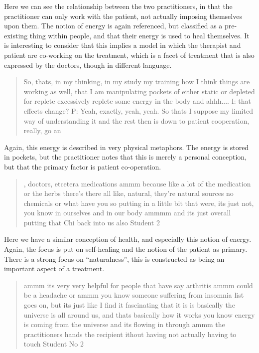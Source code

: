 Here we can see the relationship between the two practitioners, in that the practitioner can only work with the patient, not actually imposing themselves upon them. The notion of energy is again referenced, but classified as a pre-existing thing within people, and that their energy is used to heal themselves. It is interesting to consider that this implies a model in which the therapist and patient are co-working on the treatment, which is a facet of treatment that is also expressed by the doctors, though in different language. 

\begin{quotation}
  So, thats, in my thinking, in my study my training how I think things are working as well, that I am manipulating pockets of either static or depleted for replete excessively replete some energy in the body and ahhh....
I: that effects change?
P: Yeah, exactly, yeah, yeah. So thats I suppose my limited way of understanding it and the rest then is down to patient cooperation, really, go an

\end{quotation}

Again, this energy is described in very physical metaphors. The energy is stored in pockets, but the practitioner notes that this is merely a personal conception, but that the primary factor is patient co-operation. 



  
\begin{quotation}
  , doctors, etcetera medications ammm because like a lot of the medication or the herbs there's there all like, natural, they're natural sources no chemicals or what have you so putting in a little bit that were, its just not, you know in ourselves and in our body ammmm and its just overall putting that Chi back into us also
Student 2
\end{quotation}

Here we have a similar conception of health, and especially this notion  of energy. Again, the focus is put on self-healing and the notion of the patient as primary. There is a strong focus on ``naturalness'', this is constructed as being an important aspect of a treatment. 

\begin{quotation}
  ammm its very very helpful for people that have say arthritis ammm could be a headache or ammm you know someone suffering from insomnia list goes on, but its just like I find it fascinating that it is is basically the universe is all around us, and thats basically how it works you know energy is coming from the universe and its flowing in through ammm the practitioners hands the recipient ithout having not actually having to touch 
Student No 2
\end{quotation}

